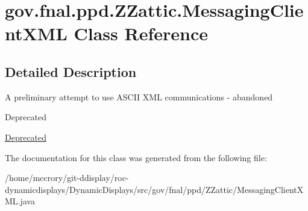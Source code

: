 \hypertarget{classgov_1_1fnal_1_1ppd_1_1ZZattic_1_1MessagingClientXML}{\section{gov.\-fnal.\-ppd.\-Z\-Zattic.\-Messaging\-Client\-X\-M\-L Class Reference}
\label{classgov_1_1fnal_1_1ppd_1_1ZZattic_1_1MessagingClientXML}
}


\subsection{Detailed Description}
A preliminary attempt to use A\-S\-C\-I\-I X\-M\-L communications -\/ abandoned \begin{DoxyRefDesc}{Deprecated}
\item[\hyperlink{deprecated__deprecated000021}{Deprecated}]\end{DoxyRefDesc}


The documentation for this class was generated from the following file\-:\begin{DoxyCompactItemize}
\item 
/home/mccrory/git-\/ddisplay/roc-\/dynamicdisplays/\-Dynamic\-Displays/src/gov/fnal/ppd/\-Z\-Zattic/Messaging\-Client\-X\-M\-L.\-java\end{DoxyCompactItemize}
